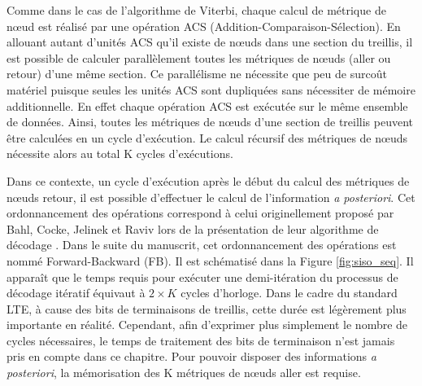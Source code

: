 Comme dans le cas de l'algorithme de Viterbi, chaque calcul de métrique de nœud est réalisé par une opération ACS 
(Addition-Comparaison-Sélection). En allouant autant d'unités ACS qu'il existe de nœuds dans une section du treillis, 
il est possible de calculer parallèlement toutes les métriques de nœuds (aller ou retour) d'une même section. Ce
parallélisme ne nécessite que peu de surcoût matériel puisque seules les unités ACS sont dupliquées sans nécessiter
de mémoire additionnelle. En effet chaque opération ACS est exécutée sur le même ensemble de données. Ainsi, toutes les 
métriques de nœuds d'une section de treillis peuvent être calculées en un cycle d'exécution. Le calcul récursif des métriques de 
nœuds nécessite alors au total K cycles d'exécutions.

Dans ce contexte, un cycle d'exécution après le début du calcul des métriques de nœuds retour, il est possible d'effectuer le calcul de l'information 
\textit{a posteriori}. Cet ordonnancement des opérations correspond à celui originellement proposé par Bahl, Cocke, 
Jelinek et Raviv lors de la présentation de leur algorithme de décodage \cite{bcjr}. Dans le suite du manuscrit, cet
ordonnancement des opérations est nommé Forward-Backward (FB). Il est schématisé dans la Figure \ref{fig:siso_seq}.
Il apparaît que le temps requis pour exécuter une demi-itération du processus de décodage itératif équivaut à $2\times K$ cycles d'horloge. Dans le cadre du standard LTE, à cause des bits de terminaisons de treillis, cette durée est légèrement
plus importante en réalité. Cependant, afin d'exprimer plus simplement le nombre de cycles nécessaires, le temps de 
traitement des bits de terminaison n'est jamais pris en compte dans ce chapitre.
Pour pouvoir disposer des informations 
\textit{a posteriori}, la mémorisation des K métriques de nœuds aller est requise. 

